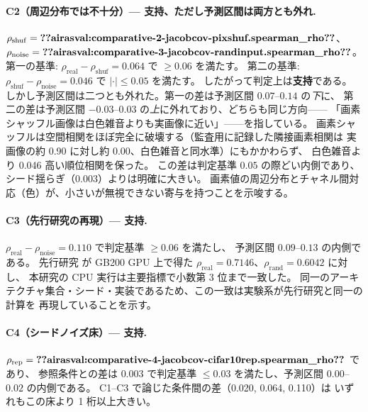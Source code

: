 \documentclass[11pt]{article}
\providecommand{\airasval}[1]{\textbf{??airasval:\detokenize{#1}??}}
\providecommand{\unverified}[1]{#1}
\begin{document}
\paragraph{C2（周辺分布では不十分）— 支持、ただし予測区間は両方とも外れ.}
$\rho_{\mathrm{shuf}} = \airasval{comparative-2-jacobcov-pixshuf.spearman_rho}$、
$\rho_{\mathrm{noise}} = \airasval{comparative-3-jacobcov-randinput.spearman_rho}$。
第一の基準: $\rho_{\mathrm{real}} - \rho_{\mathrm{shuf}} = \unverified{0.064}$ で $\ge 0.06$ を満たす。
第二の基準: $\rho_{\mathrm{shuf}} - \rho_{\mathrm{noise}} = \unverified{0.046}$ で $|\cdot| \le 0.05$ を満たす。
したがって判定上は\textbf{支持}である。
しかし予測区間は二つとも外れた。第一の差は予測区間 $0.07$--$0.14$ の\emph{下}に、
第二の差は予測区間 $-0.03$--$0.03$ の\emph{上}に外れており、どちらも同じ方向——
「画素シャッフル画像は白色雑音よりも実画像に近い」——を指している。
画素シャッフルは空間相関をほぼ完全に破壊する（監査用に記録した隣接画素相関は
実画像の約 0.90 に対し約 $0.00$、白色雑音と同水準）にもかかわらず、
白色雑音より \unverified{0.046} 高い順位相関を保った。
この差は判定基準 $0.05$ の際どい内側であり、シード揺らぎ（\unverified{0.003}）よりは明確に大きい。
画素値の周辺分布とチャネル間対応（色）が、小さいが無視できない寄与を持つことを示唆する。

\paragraph{C3（先行研究の再現）— 支持.}
$\rho_{\mathrm{real}} - \rho_{\mathrm{noise}} = \unverified{0.110}$ で判定基準 $\ge 0.06$ を満たし、
予測区間 $0.09$--$0.13$ の内側である。
先行研究 \cite{airas20260903zcproxy} が GB200 GPU 上で得た
$\rho_{\mathrm{real}} = \unverified{0.7146}$、$\rho_{\mathrm{rand}} = \unverified{0.6042}$ に対し、
本研究の CPU 実行は主要指標で小数第 3 位まで一致した。
同一のアーキテクチャ集合・シード・実装であるため、この一致は実験系が先行研究と同一の計算を
再現していることを示す。

\paragraph{C4（シードノイズ床）— 支持.}
$\rho_{\mathrm{rep}} = \airasval{comparative-4-jacobcov-cifar10rep.spearman_rho}$ であり、
参照条件との差は $\unverified{0.003}$ で判定基準 $\le 0.03$ を満たし、予測区間 $0.00$--$0.02$ の内側である。
C1--C3 で論じた条件間の差（\unverified{0.020}, \unverified{0.064}, \unverified{0.110}）は
いずれもこの床より 1 桁以上大きい。
\end{document}
